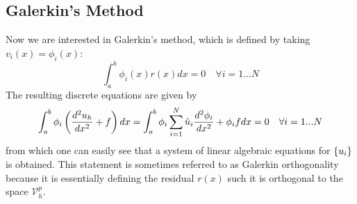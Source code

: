 \subsection{Galerkin's Method}
Now we are interested in Galerkin's method, which is defined by taking $v_{i}(x) = \phi_{i}(x)$:
\begin{equation}
\int_{a}^{b} \phi_{i}(x) r(x)dx = 0 \quad \forall i = 1...N
\end{equation}
The resulting discrete equations are given by 
\begin{equation}
\int_{a}^{b} \phi_{i} \left(  \frac{d^{2} u_{h}}{dx^{2}} + f \right) dx = \int_{a}^{b}\phi_{i} \sum_{i=1}^{N} \hat{u}_{i} \frac{d^{2} \phi_{i} }{dx^{2}} + \phi_{i} f dx = 0 \quad \forall i = 1...N
\end{equation}
from which one can easily see that a system of linear algebraic equations for $\left\{ u_{i} \right\}$ is obtained.  This statement is sometimes referred to as Galerkin orthogonality because it is essentially defining the residual $r(x)$ such it is orthogonal to the space $\mathcal{V}_{h}^{p}$.    

